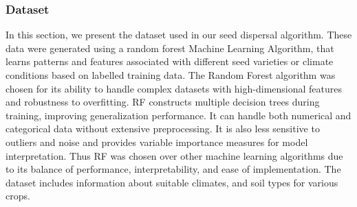 \documentclass[conference]{IEEEtran}
\begin{document}
\subsubsection*{Dataset}
In this section, we present the dataset used in our seed dispersal algorithm. These data were generated using a random forest Machine Learning Algorithm, that learns patterns and features associated with different seed varieties or climate conditions based on labelled training data. 
The Random Forest algorithm was chosen for its ability to handle complex datasets with high-dimensional features and robustness to overfitting. RF constructs multiple decision trees during training, improving generalization performance. It can handle both numerical and categorical data without extensive preprocessing. It is also less sensitive to outliers and noise and provides variable importance measures for model interpretation. Thus RF was chosen over other machine learning algorithms due to its balance of performance, interpretability, and ease of implementation. The dataset includes information about suitable climates, and soil types for various crops.
\end{document}
